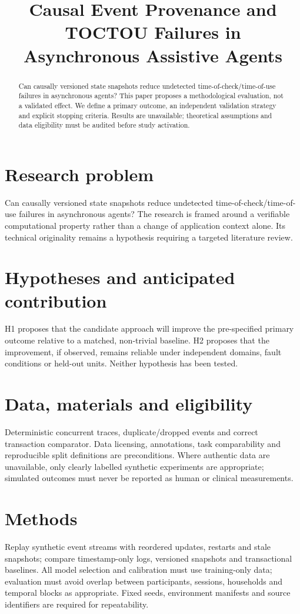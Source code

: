\documentclass[11pt,a4paper]{article}
\title{Causal Event Provenance and TOCTOU Failures in Asynchronous Assistive Agents}
\author{}
\date{}
\begin{document}
\maketitle
\begin{abstract}
Can causally versioned state snapshots reduce undetected time-of-check/time-of-use failures in asynchronous agents? This paper proposes a methodological evaluation, not a validated effect. We define a primary outcome, an independent validation strategy and explicit stopping criteria. Results are unavailable; theoretical assumptions and data eligibility must be audited before study activation.
\end{abstract}
\section{Research problem}
Can causally versioned state snapshots reduce undetected time-of-check/time-of-use failures in asynchronous agents? The research is framed around a verifiable computational property rather than a change of application context alone. Its technical originality remains a hypothesis requiring a targeted literature review.
\section{Hypotheses and anticipated contribution}
H1 proposes that the candidate approach will improve the pre-specified primary outcome relative to a matched, non-trivial baseline. H2 proposes that the improvement, if observed, remains reliable under independent domains, fault conditions or held-out units. Neither hypothesis has been tested.
\section{Data, materials and eligibility}
Deterministic concurrent traces, duplicate/dropped events and correct transaction comparator. Data licensing, annotations, task comparability and reproducible split definitions are preconditions. Where authentic data are unavailable, only clearly labelled synthetic experiments are appropriate; simulated outcomes must never be reported as human or clinical measurements.
\section{Methods}
Replay synthetic event streams with reordered updates, restarts and stale snapshots; compare timestamp-only logs, versioned snapshots and transactional baselines. All model selection and calibration must use training-only data; evaluation must avoid overlap between participants, sessions, households and temporal blocks as appropriate. Fixed seeds, environment manifests and source identifiers are required for repeatability.
\end{document}
